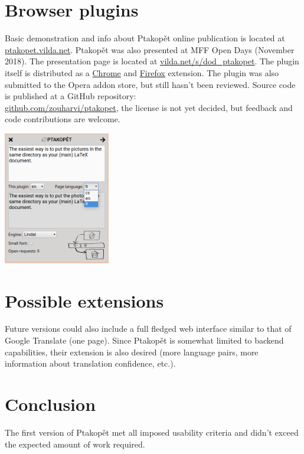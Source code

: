 \documentclass[a4paper]{article}
\begin{document}
\section{Browser plugins}
Basic demonstration and info about Ptakopět online publication is located at \href{http://ptakopet.vilda.net}{ptakopet.vilda.net}. Ptakopět was also presented at MFF Open Days (November 2018). The presentation page is located at \href{https://vilda.net/s/dod\_ptakopet}{vilda.net/s/dod\_ptakopet}. The plugin itself is distributed as a \href{https://chrome.google.com/webstore/detail/ptakop\%C4\%9Bt/hgjlgmhmcmcmjiclegnipnaeejpibjmn}{Chrome} and \href{https://addons.mozilla.org/en-US/firefox/addon/ptakop\%C4\%9Bt/}{Firefox} extension. The plugin was also submitted to the Opera addon store, but still hasn't been reviewed.
Source code is published at a GitHub repository:\\ \href{https://github.com/zouharvi/ptakopet}{github.com/zouharvi/ptakopet}, the license is not yet decided, but feedback and code contributions are welcome.

\begin{center}
\includegraphics[width=0.35\textwidth]{screenshot_4}
\end{center}

\section{Possible extensions}
Future versions could also include a full fledged web interface similar to that of Google Translate (one page). Since Ptakopět is somewhat limited to backend capabilities, their extension is also desired (more language pairs, more information about translation confidence, etc.).

\section{Conclusion}
The first version of Ptakopět met all imposed usability criteria and didn't exceed the expected amount of work required. 
\end{document}
